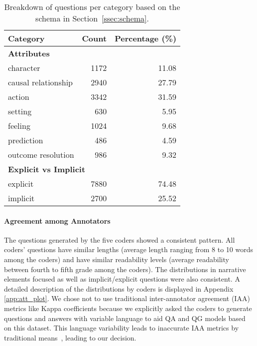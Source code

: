 \documentclass[11pt]{article}
\begin{document}
\begin{table}[t]
\centering
\small
\begin{tabular}{lrr}
\toprule
\textbf{Category}   & \textbf{Count} & \textbf{Percentage (\%)} \\ \midrule\midrule
\multicolumn{3}{l}{\textbf{Attributes}}                    \\
character           & 1172           & 11.08             \\
causal relationship & 2940           & 27.79             \\
action              & 3342           & 31.59             \\
setting             & 630            & 5.95              \\
feeling             & 1024           & 9.68              \\
prediction          & 486            & 4.59              \\
outcome resolution  & 986            & 9.32              \\
\midrule
\multicolumn{3}{l}{\textbf{Explicit vs Implicit}}          \\
explicit            & 7880           & 74.48             \\
implicit            & 2700           & 25.52             \\
\bottomrule
\end{tabular}
\caption{\small{Breakdown of questions per category based on the schema in Section~\ref{ssec:schema}.}} 
\label{tab:category_vals}
\end{table}


\paragraph{Agreement among Annotators} The questions generated by the five coders showed a consistent pattern. All coders' questions have similar lengths (average length ranging from 8 to 10 words among the coders) and have similar readability levels (average readability between fourth to fifth grade among the coders). The distributions in narrative elements focused as well as implicit/explicit questions were also consistent. A detailed description of the distributions by coders is displayed in Appendix \ref{app:att_plot}. We chose not to use traditional inter-annotator agreement (IAA) metrics like Kappa coefficients because we explicitly asked the coders to generate questions and answers with variable language to aid QA and QG models based on this dataset. This language variability leads to inaccurate IAA metrics by traditional means~\cite{amidei2018kappa}, leading to our decision.
\end{document}
